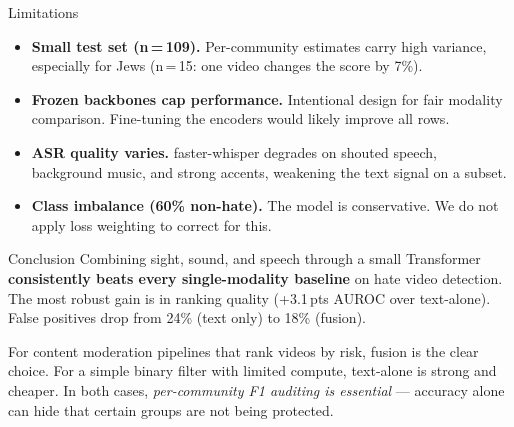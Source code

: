 \begin{minipage}[t]{0.465\textwidth}
  \begin{pbox}{Limitations}
    \begin{itemize}[leftmargin=7mm, itemsep=3mm]
      \item \textbf{Small test set (n\,=\,109).}
            Per-community estimates carry high variance, especially
            for Jews (n\,=\,15: one video changes the score by 7\%).
      \item \textbf{Frozen backbones cap performance.}
            Intentional design for fair modality comparison.
            Fine-tuning the encoders would likely improve all rows.
      \item \textbf{ASR quality varies.}
            faster-whisper degrades on shouted speech, background music,
            and strong accents, weakening the text signal on a subset.
      \item \textbf{Class imbalance (60\% non-hate).}
            The model is conservative. We do not apply loss weighting
            to correct for this.
    \end{itemize}
  \end{pbox}

  \vspace{5mm}

  \begin{pbox}{Conclusion}
    Combining sight, sound, and speech through a small Transformer
    \textbf{consistently beats every single-modality baseline} on hate
    video detection.
    The most robust gain is in ranking quality (+3.1\,pts AUROC over
    text-alone).
    False positives drop from 24\% (text only) to 18\% (fusion).

    \vspace{4mm}
    For content moderation pipelines that rank videos by risk,
    fusion is the clear choice.
    For a simple binary filter with limited compute,
    text-alone is strong and cheaper.
    In both cases, \emph{per-community F1 auditing is essential} ---
    accuracy alone can hide that certain groups are not being protected.
  \end{pbox}

\end{minipage}  %

\vfill
\noindent{\color{gray!40}\rule{\textwidth}{0.5pt}}\\[2mm]


